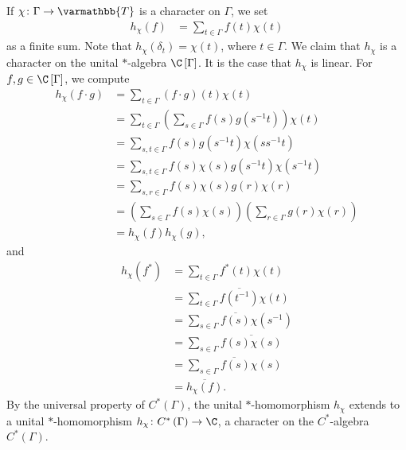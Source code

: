 \documentclass[10pt]{mypackage}
\renewcommand*{\mathbb}[1]{\varmathbb{#1}}
\newcommand{\T}{\mathbb{T}}
\begin{document}
\begin{example}
  If $\chi\colon \Gamma\rightarrow \T$ is a character on $\Gamma$, we set
  \begin{align*}
    h_{\chi}\left(f\right) &= \sum_{t\in\Gamma}f(t)\chi(t)
  \end{align*}
  as a finite sum. Note that $h_{\chi}\left(\delta_t\right) = \chi(t)$, where $t\in \Gamma$. We claim that $h_{\chi}$ is a character on the unital $\ast$-algebra $\C\left[\Gamma\right]$. It is the case that $h_{\chi}$ is linear. For $f,g\in \C\left[\Gamma\right]$, we compute
  \begin{align*}
    h_{\chi}\left(f\cdot g\right) &= \sum_{t\in \Gamma}\left(f\cdot g\right)\left(t\right)\chi\left(t\right)\\
                                  &= \sum_{t\in \Gamma}\left(\sum_{s\in \Gamma}f\left(s\right)g\left(s^{-1}t\right)\right)\chi\left(t\right)\\
                                  &= \sum_{s,t\in\Gamma}f\left(s\right)g\left(s^{-1}t\right)\chi\left(ss^{-1}t\right)\\
                                  &= \sum_{s,t\in\Gamma}f\left(s\right)\chi\left(s\right)g\left(s^{-1}t\right)\chi\left(s^{-1}t\right)\\
                                  &= \sum_{s,r\in\Gamma}f\left(s\right)\chi\left(s\right)g\left(r\right)\chi\left(r\right)\\
                                  &= \left(\sum_{s\in\Gamma}f\left(s\right)\chi\left(s\right)\right)\left(\sum_{r\in\Gamma}g\left(r\right)\chi\left(r\right)\right)\\
                                  &= h_{\chi}\left(f\right)h_{\chi}\left(g\right),
  \end{align*}
  and
  \begin{align*}
    h_{\chi}\left(f^{\ast}\right) &= \sum_{t\in\Gamma}f^{\ast}\left(t\right)\chi\left(t\right)\\
                                  &= \sum_{t\in\Gamma}\overline{f\left(t^{-1}\right)}\chi\left(t\right)\\
                                  &= \sum_{s\in\Gamma}\overline{f\left(s\right)}\chi\left(s^{-1}\right)\\
                                  &= \sum_{s\in\Gamma}\overline{f\left(s\right)\chi\left(s\right)}\\
                                  &= \overline{\sum_{s\in\Gamma}f\left(s\right)\chi\left(s\right)}\\
                                  &= \overline{h_{\chi}\left(f\right)}.
  \end{align*}
  By the universal property of $C^{\ast}\left(\Gamma\right)$, the unital $\ast$-homomorphism $h_{\chi}$ extends to a unital $\ast$-homomorphism $h_{\chi}\colon C^{\ast}\left(\Gamma\right)\rightarrow \C$, a character on the $C^{\ast}$-algebra $C^{\ast}\left(\Gamma\right)$.\newline


\end{example}
\end{document}
